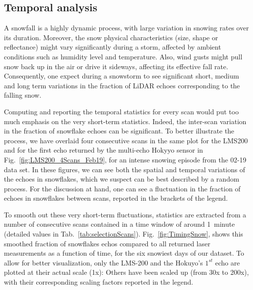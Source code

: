
\subsection{Temporal analysis}
A snowfall is a highly dynamic process, with large variation in snowing rates over its duration. Moreover, the snow physical characteristics (size, shape or reflectance) might vary significantly during a storm, affected by ambient conditions such as humidity level and temperature. Also, wind gusts might pull snow back up in the air or drive it sideways, affecting its effective fall rate. Consequently, one expect during a snowstorm to see significant short, medium and long term variations in the fraction of LiDAR echoes corresponding to the falling snow. 

Computing and reporting the temporal statistics for every scan would put too much emphasis on the very short-term statistics. Indeed, the inter-scan variation in the fraction of snowflake echoes can be significant. To better illustrate the process, we have overlaid four consecutive scans in the same plot for the LMS200 and for the first echo returned by the multi-echo Hokyyo sensor in Fig.~\ref{fig:LMS200_4Scans_Feb19}, for an intense snowing episode from the 02-19 data set. In these figures, we can see both the spatial and temporal variations of the echoes in snowflakes, which we suspect can be best described by a random process. For the discussion at hand, one can see a fluctuation in the fraction of echoes in snowflakes between scans, reported in the brackets of the legend. 

To smooth out these very short-term fluctuations, statistics are extracted from a number of consecutive scans contained in a time window of around 1~minute (detailed values in Tab.~\ref{tab:selectionScans}). Fig.~\ref{fig:TimingSnow}, shows this smoothed fraction of snowflakes echos compared to all returned laser measurements as a function of time, for the six snowiest days of our dataset. To allow for better visualization, only the LMS-200 and the Hokuyo's $1^{st}$ echo are plotted at their actual scale (1x): Others have been scaled up (from 30x to 200x), with their corresponding scaling factors reported in the legend. 

